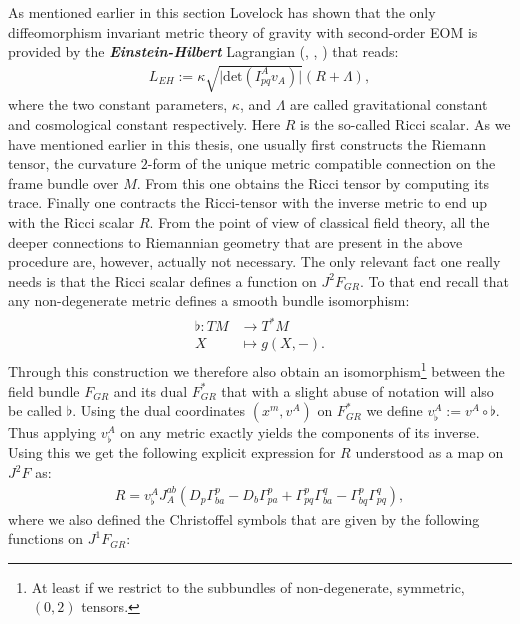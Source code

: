 As mentioned earlier in this section Lovelock has shown that the only diffeomorphism invariant metric theory of gravity with second-order EOM is provided by the \textit{\textbf{Einstein-Hilbert}} Lagrangian (\cite{Lovelock1969}, \cite{doi:10.1063/1.1665613}, \cite{doi:10.1063/1.1666069}) that reads:
\begin{align}
    L_{EH} := \kappa \sqrt{\vert \mathrm{det} \left ( I^A_{pq}v_A \right ) \vert }  \left( R + \Lambda \right ),
\end{align}
where the two constant parameters, $\kappa$, and $\Lambda$ are called gravitational constant and cosmological constant respectively. Here $R$ is the so-called Ricci scalar. As we have mentioned earlier in this thesis, one usually first constructs the Riemann tensor, the curvature  $2$-form of the unique metric compatible connection on the frame bundle over $M$. From this one obtains the Ricci tensor by computing its trace. Finally one contracts the Ricci-tensor with the inverse metric to end up with the Ricci scalar $R$. From the point of view of classical field theory, all the deeper connections to Riemannian geometry that are present in the above procedure are, however, actually not necessary. The only relevant fact one really needs is that the Ricci scalar defines a function on $J^2F_{GR}$. To that end recall that any non-degenerate metric defines a smooth bundle isomorphism:
\begin{align}\label{music}
\begin{aligned}
\flat : TM &\longrightarrow T^{\ast}M\\
X &\longmapsto g(X,-) .
\end{aligned}
\end{align}
Through this construction we therefore also obtain an isomorphism\footnote{At least if we restrict to the subbundles of non-degenerate, symmetric, $(0,2)$ tensors.} between the field bundle $F_{GR}$ and its dual $F_{GR}^{\ast}$ that with a slight abuse of notation will also be called $\flat$. 
Using the dual coordinates $(x^m,v^A)$ on $F_{GR}^{\ast}$ we define $v^A_{\flat} := v^A \circ \flat$. Thus applying $v^A_{\flat}$ on any metric exactly yields the components of its inverse. Using this we get the following explicit expression for $R$ understood as a map on $J^2F$ as:
\begin{align}
R = v_{\flat}^A J_A^{ab} \left ( D_p \Gamma^p_{ba} - D_b \Gamma^p_{pa} + \Gamma^p_{pq} \Gamma^q_{ba} - \Gamma^p_{bq} \Gamma^q_{pq} \right ),
\end{align}
where we also defined the Christoffel symbols that are given by the following functions on $J^1F_{GR}$:
